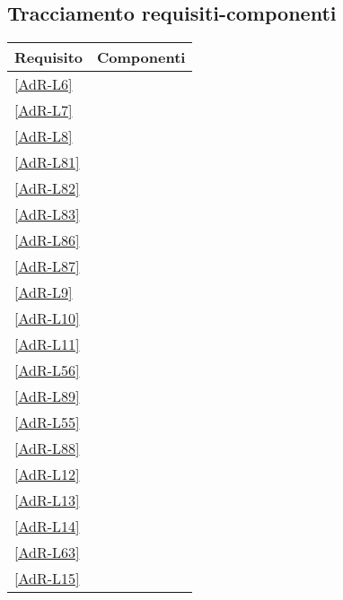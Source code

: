 \subsection{Tracciamento requisiti-componenti}

\begin{longtable}{|P{6cm}|P{6cm}|}
	\hline \textbf{Requisito} & \textbf{Componenti} \\ 
	\endfirsthead
	\hline \ref{AdR-L6} &  \\ %
	\hline \ref{AdR-L7} &  \\ 
	\hline \ref{AdR-L8} &  \\
	\hline \ref{AdR-L81} &  \\
	\hline \ref{AdR-L82} &  \\
	\hline \ref{AdR-L83} &  \\ %
	\hline \ref{AdR-L86} &  \\
	\hline \ref{AdR-L87} &  \\
	\hline \ref{AdR-L9} &  \\
	\hline \ref{AdR-L10} &  \\
	\hline \ref{AdR-L11} &  \linebreak {} \\ %
	\hline \ref{AdR-L56} &  \linebreak {} \\
	\hline \ref{AdR-L89} &  \linebreak {} \linebreak {} \\
	\hline \ref{AdR-L55} &  \linebreak {} \\
	\hline \ref{AdR-L88} &  \linebreak {} \\
	\hline \ref{AdR-L12} &  \\ %
	\hline \ref{AdR-L13} &  \\
	\hline \ref{AdR-L14} &  \\
	\hline \ref{AdR-L63} &  \\
	\hline \ref{AdR-L15} &  \\

\end{longtable}
